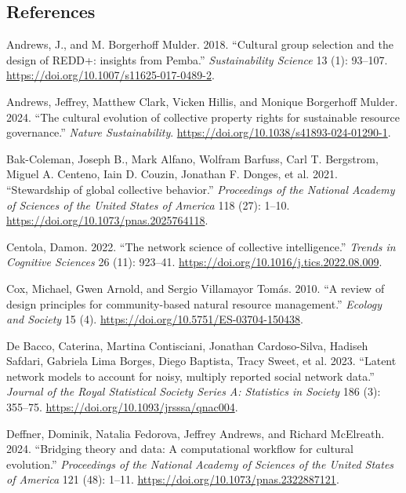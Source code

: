 \documentclass[letterpaper]{article}
\newlength{\cslhangindent}
\newenvironment{CSLReferences}[2] %
 {\begin{list}{}{%
  \setlength{\itemindent}{0pt}
  \setlength{\leftmargin}{0pt}
  \setlength{\parsep}{0pt}
  \ifodd #1
   \setlength{\leftmargin}{\cslhangindent}
   \setlength{\itemindent}{-1\cslhangindent}
  \fi
  \setlength{\itemsep}{#2\baselineskip}}}
 {\end{list}}
\begin{document}
\subsection{References}\label{references}

\label{refs}
\begin{CSLReferences}{1}{0}
Andrews, J., and M. Borgerhoff Mulder. 2018. {``{Cultural group
selection and the design of REDD+: insights from Pemba}.''}
\emph{Sustainability Science} 13 (1): 93--107.
\url{https://doi.org/10.1007/s11625-017-0489-2}.

Andrews, Jeffrey, Matthew Clark, Vicken Hillis, and Monique Borgerhoff
Mulder. 2024. {``{The cultural evolution of collective property rights
for sustainable resource governance}.''} \emph{Nature Sustainability}.
\url{https://doi.org/10.1038/s41893-024-01290-1}.

Bak-Coleman, Joseph B., Mark Alfano, Wolfram Barfuss, Carl T. Bergstrom,
Miguel A. Centeno, Iain D. Couzin, Jonathan F. Donges, et al. 2021.
{``{Stewardship of global collective behavior}.''} \emph{Proceedings of
the National Academy of Sciences of the United States of America} 118
(27): 1--10. \url{https://doi.org/10.1073/pnas.2025764118}.

Centola, Damon. 2022. {``{The network science of collective
intelligence}.''} \emph{Trends in Cognitive Sciences} 26 (11): 923--41.
\url{https://doi.org/10.1016/j.tics.2022.08.009}.

Cox, Michael, Gwen Arnold, and Sergio Villamayor Tomás. 2010. {``{A
review of design principles for community-based natural resource
management}.''} \emph{Ecology and Society} 15 (4).
\url{https://doi.org/10.5751/ES-03704-150438}.

De Bacco, Caterina, Martina Contisciani, Jonathan Cardoso-Silva, Hadiseh
Safdari, Gabriela Lima Borges, Diego Baptista, Tracy Sweet, et al. 2023.
{``{Latent network models to account for noisy, multiply reported social
network data}.''} \emph{Journal of the Royal Statistical Society Series
A: Statistics in Society} 186 (3): 355--75.
\url{https://doi.org/10.1093/jrsssa/qnac004}.

Deffner, Dominik, Natalia Fedorova, Jeffrey Andrews, and Richard
McElreath. 2024. {``{Bridging theory and data: A computational workflow
for cultural evolution}.''} \emph{Proceedings of the National Academy of
Sciences of the United States of America} 121 (48): 1--11.
\url{https://doi.org/10.1073/pnas.2322887121}.


\end{CSLReferences}
\end{document}
